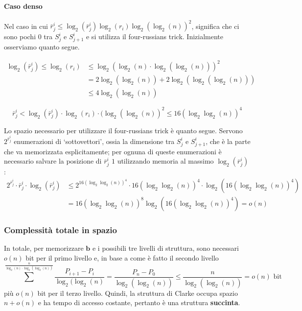 \paragraph{Caso denso}
Nel caso in cui $\bar{r}^i_j \le \log_2(\bar{r}^i_j) \log_2(r_i) \log_2(\log_2(n))^2$,
significa che ci sono pochi $0$ tra $S^i_j$ e $S^i_{j+1}$ e
si utilizza il four-russians trick. Inizialmente osserviamo quanto segue.
\begin{oss}
	\begin{align*}
		\log_2(\bar{r}^i_j) \leq \log_2(r_i) & \leq \log_2(\log_2(n)\cdot \log_2(\log_2(n)))^2     \\
		                                     & = 2 \log_2(\log_2(n)) + 2 \log_2(\log_2(\log_2(n))) \\
		                                     & \leq 4 \log_2(\log_2(n))
	\end{align*}
\end{oss}
\begin{oss}
	$$
		\bar{r}^i_j < \log_2(\bar{r}^i_j) \cdot \log_2(r_i) \cdot (\log_2(\log_2(n))^2
		\leq 16(\log_2\log_2(n))^4
	$$
\end{oss}
Lo spazio necessario per utilizzare il four-russians trick è quanto segue.
Servono $2^{\bar{r}^i_j}$ enumerazioni di `sottovettori',
ossia la dimensione tra $S^i_j$ e $S^i_{j+1}$,
che è la parte che va memorizzata esplicitamente; per ognuna di queste
enumerazioni è necessario salvare la posizione di $\bar{r}^i_j$ $1$ utilizzando
memoria al massimo $\log_2(\bar{r}^i_j)$:
\begin{align*}
	2^{\bar{r}^i_j} \cdot \bar{r}^i_j \cdot \log_2(\bar{r}^i_j) & \leq
	2^{16(\log_2\log_2(n))^4} \cdot 16(\log_2\log_2(n))^4 \cdot \log_2(16(\log_2\log_2(n))^4)                                  \\
	                                                            & = 16(\log_2\log_2(n))^8 \log_2(16(\log_2\log_2(n))^4) = o(n)
\end{align*}


\subsubsection{Complessità totale in spazio}
In totale, per memorizzare $\mathbf{b}$ e i possibili tre livelli di struttura,
sono necessari $o(n)$ bit per il primo livello e, in base a come è fatto il secondo livello
$$
	\sum^{\frac{n}{\log_2(n)\cdot \log_2(\log_2(n))}} \frac{P_{i+1} - P_i}{\log_2(\log_2(n)}
	= \frac{P_n - P_0}{\log_2(\log_2(n))}
	\leq \frac{n}{\log_2(\log_2(n))} = o(n) \text{ bit}
$$
più $o(n)$ bit per il terzo livello. Quindi, la struttura di Clarke occupa
spazio $n + o(n)$ e ha tempo di accesso costante, pertanto è
una struttura \textbf{succinta}.


